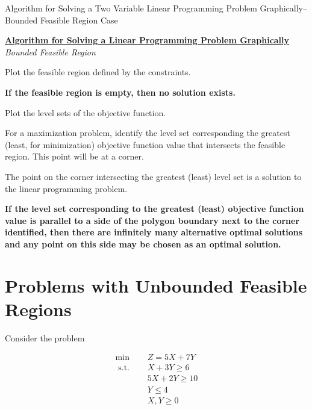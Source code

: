 \begin{algorithm}[H]
\caption{Algorithm for Solving a Two Variable Linear Programming Problem Graphically--Bounded Feasible Region Case}
\label{alg:GraphLPBoundedEmpty}
\begin{center}
\begin{minipage}[t]{\textwidth-1em}
\underline{\textbf{Algorithm for Solving a Linear Programming Problem Graphically}}\\
\textit{Bounded Feasible Region}
\begin{enumerate*}
\item Plot the feasible region defined by the constraints.
\item \textbf{If the feasible region is empty, then no solution exists.}
\item Plot the level sets of the objective function.
\item For a maximization problem, identify the level set corresponding the greatest (least, for minimization) objective function value that intersects the feasible region. This point will be at a corner. 
\item The point on the corner intersecting the greatest (least) level set is a solution to the linear programming problem. 
\item \textbf{If the level set corresponding to the greatest (least) objective function value is parallel to a side of the polygon boundary next to the corner identified, then there are infinitely many alternative optimal solutions and any point on this side may be chosen as an optimal solution.} 
\end{enumerate*}
\end{minipage}
\end{center}
\end{algorithm}

\section{Problems with Unbounded Feasible Regions}

Consider the problem

\begin{align*}
\min \quad & Z =5 X+7 Y  \\ 
\text { s.t. } \quad & X+3 Y \geq 6 \\ 
&5 X+ 2 Y \geq 10 \\ 
&Y  \leq 4 \\ 
&X, Y  \geq 0 
\end{align*}


